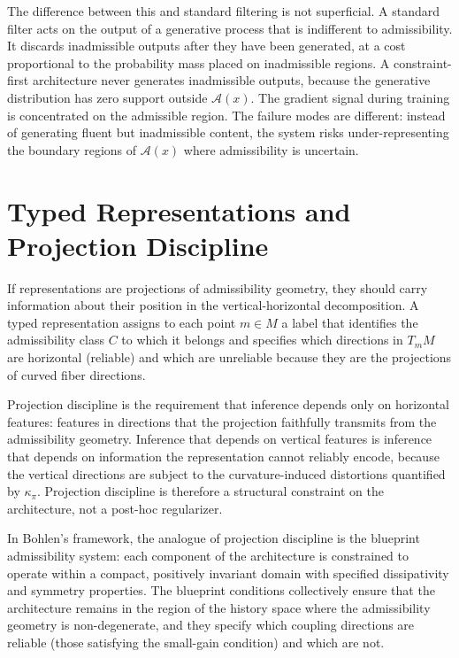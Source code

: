 \documentclass[12pt, oneside]{book}
\theoremstyle{plain-flyxion}
\theoremstyle{definition-flyxion}
\newcommand{\A}{\mathcal{A}}
\newcommand{\kpi}{\kappa_{\pi}}
\begin{document}
The difference between this and standard filtering is not superficial. A standard filter
acts on the output of a generative process that is indifferent to admissibility. It
discards inadmissible outputs after they have been generated, at a cost proportional to
the probability mass placed on inadmissible regions. A constraint-first architecture never
generates inadmissible outputs, because the generative distribution has zero support
outside $\A(x)$. The gradient signal during training is concentrated on the admissible
region. The failure modes are different: instead of generating fluent but inadmissible
content, the system risks under-representing the boundary regions of $\A(x)$ where
admissibility is uncertain.

\section{Typed Representations and Projection Discipline}

If representations are projections of admissibility geometry, they should carry
information about their position in the vertical-horizontal decomposition. A typed
representation assigns to each point $m\in M$ a label that identifies the admissibility
class $C$ to which it belongs and specifies which directions in $T_m M$ are horizontal
(reliable) and which are unreliable because they are the projections of curved fiber
directions.

Projection discipline is the requirement that inference depends only on horizontal
features: features in directions that the projection faithfully transmits from the
admissibility geometry. Inference that depends on vertical features is inference that
depends on information the representation cannot reliably encode, because the vertical
directions are subject to the curvature-induced distortions quantified by $\kpi$.
Projection discipline is therefore a structural constraint on the architecture, not a
post-hoc regularizer.

In Bohlen's framework, the analogue of projection discipline is the blueprint admissibility
system: each component of the architecture is constrained to operate within a compact,
positively invariant domain with specified dissipativity and symmetry properties. The
blueprint conditions collectively ensure that the architecture remains in the region of
the history space where the admissibility geometry is non-degenerate, and they specify
which coupling directions are reliable (those satisfying the small-gain condition) and
which are not.
\end{document}
